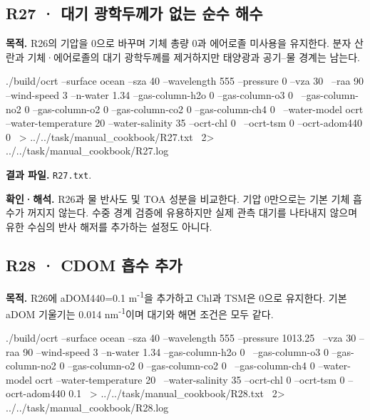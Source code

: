 
\subsection{R27 · 대기 광학두께가 없는 순수 해수}
\label{sec:auto:09_cookbook:6.2}

\label{recipe:R27}

\textbf{목적. }R26의 기압을 0으로 바꾸며 기체 총량 0과 에어로졸 미사용을 유지한다. 분자 산란과 기체·에어로졸의 대기 광학두께를 제거하지만 태양광과 공기–물 경계는 남는다.

\noindent\begin{minipage}{\linewidth}
\begin{ManualCode}

./build/ocrt --surface ocean --sza 40 --wavelength 555 --pressure 0 --vza 30 \
  --raa 90 --wind-speed 3 --n-water 1.34 --gas-column-h2o 0 --gas-column-o3 0 \
  --gas-column-no2 0 --gas-column-o2 0 --gas-column-co2 0 --gas-column-ch4 0 \
  --water-model ocrt --water-temperature 20 --water-salinity 35 --ocrt-chl 0 \
  --ocrt-tsm 0 --ocrt-adom440 0 \
  > ../../task/manual_cookbook/R27.txt \
  2> ../../task/manual_cookbook/R27.log

\end{ManualCode}
\end{minipage}\par

\textbf{결과 파일. }\texttt{R27.txt}.

\textbf{확인·해석. }R26과 물 반사도 및 TOA 성분을 비교한다. 기압 0만으로는 기본 기체 흡수가 꺼지지 않는다. 수중 경계 검증에 유용하지만 실제 관측 대기를 나타내지 않으며 유한 수심의 반사 해저를 추가하는 설정도 아니다.


\subsection{R28 · CDOM 흡수 추가}
\label{sec:auto:09_cookbook:6.3}

\label{recipe:R28}

\textbf{목적. }R26에 aDOM440=0.1 m\textsuperscript{-1}을 추가하고 Chl과 TSM은 0으로 유지한다. 기본 aDOM 기울기는 0.014 nm\textsuperscript{-1}이며 대기와 해면 조건은 모두 같다.

\noindent\begin{minipage}{\linewidth}
\begin{ManualCode}

./build/ocrt --surface ocean --sza 40 --wavelength 555 --pressure 1013.25 \
  --vza 30 --raa 90 --wind-speed 3 --n-water 1.34 --gas-column-h2o 0 \
  --gas-column-o3 0 --gas-column-no2 0 --gas-column-o2 0 --gas-column-co2 0 \
  --gas-column-ch4 0 --water-model ocrt --water-temperature 20 \
  --water-salinity 35 --ocrt-chl 0 --ocrt-tsm 0 --ocrt-adom440 0.1 \
  > ../../task/manual_cookbook/R28.txt \
  2> ../../task/manual_cookbook/R28.log

\end{ManualCode}
\end{minipage}\par

